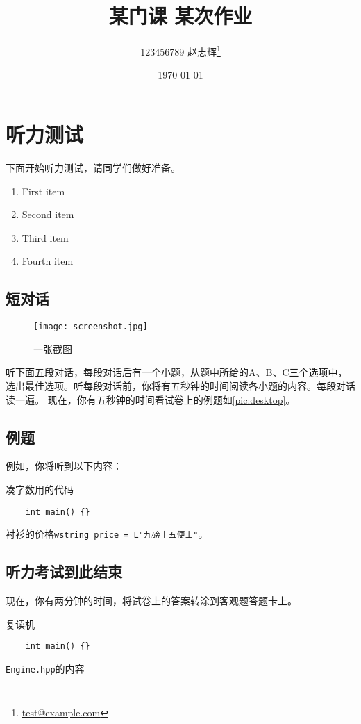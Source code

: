 \documentclass{dreamClass}
\title{\heiti\textbf{某门课 \quad 某次作业}}
\author{123456789 \quad 赵志辉\thanks{\href{mailto:test@example.com}{test@example.com}}}
\affil{九乡河文理学院}
\date{\today}
\begin{document}
\maketitle
\thispagestyle{empty}

\section{听力测试}
下面开始听力测试，请同学们做好准备。
\begin{enumerate}[label=\large\protect\textcircled{\small\arabic*}]
    \item First item
    \item Second item
    \item Third item
    \item Fourth item
\end{enumerate}

\subsection{短对话}
\begin{figure}
    \centering
    \texttt{[image: screenshot.jpg]}
    \caption{一张截图}\label{pic:desktop}
\end{figure}
听下面五段对话，每段对话后有一个小题，从题中所给的A、B、C三个选项中，选出最佳选项。听每段对话前，你将有五秒钟的时间阅读各小题的内容。每段对话读一遍。
现在，你有五秒钟的时间看试卷上的例题如\autoref{pic:desktop}。
\subsection{例题}
例如，你将听到以下内容：
\begin{listing}
    \caption{凑字数用的代码\label{code:junk}}
    \begin{verbatim}
    int main() {}
    \end{verbatim}
\end{listing}
衬衫的价格\texttt{wstring price = L"九磅十五便士"}。

\subsection{听力考试到此结束}
现在，你有两分钟的时间，将试卷上的答案转涂到客观题答题卡上。
\begin{codeblock}
    \caption{复读机\label{code:junk-again}}
    \begin{verbatim}
    int main() {}
    \end{verbatim}
\end{codeblock}

\begin{codeblock}
    \caption{\texttt{Engine.hpp}的内容}
    \inputminted{cpp}{../code/engine/Engine.hpp}
\end{codeblock}
\end{document}
